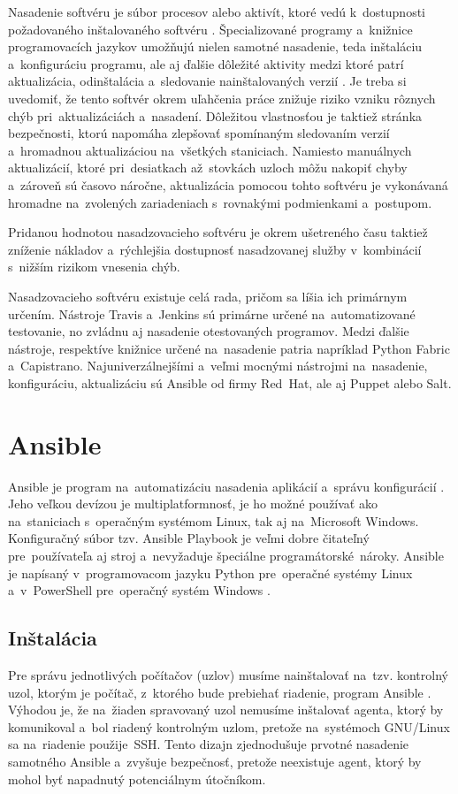 Nasadenie softvéru je súbor procesov alebo aktivít, ktoré vedú k~dostupnosti požadovaného inštalovaného softvéru \cite{deployment-web}. Špecializované programy a~knižnice programovacích jazykov umožňujú nielen samotné nasadenie, teda inštaláciu a~konfiguráciu programu, ale aj ďalšie dôležité aktivity medzi ktoré patrí aktualizácia, odinštalácia a~sledovanie nainštalovaných verzií \cite{deployment-web}. Je treba si uvedomiť, že tento softvér okrem uľahčenia práce znižuje riziko vzniku rôznych chýb pri~aktualizáciách a~nasadení. Dôležitou vlastnosťou je taktiež stránka bezpečnosti, ktorú napomáha zlepšovať spomínaným sledovaním verzií a~hromadnou aktualizáciou na~všetkých staniciach. Namiesto manuálnych aktualizácií, ktoré pri~desiatkach až~stovkách uzloch môžu nakopiť chyby a~zároveň sú časovo náročne, aktualizácia pomocou tohto softvéru je vykonávaná hromadne na~zvolených zariadeniach s~rovnakými podmienkami a~postupom.

Pridanou hodnotou nasadzovacieho softvéru je okrem ušetreného času taktiež zníženie nákladov a~rýchlejšia dostupnosť nasadzovanej služby v~kombinácií s~nižším rizikom vnesenia chýb.

Nasadzovacieho softvéru existuje celá rada, pričom sa líšia ich primárnym určením. Nástroje Travis a~Jenkins sú primárne určené na~automatizované testovanie, no zvládnu aj nasadenie otestovaných programov. Medzi ďalšie nástroje, respektíve knižnice určené na~nasadenie patria napríklad \mbox{Python} Fabric a~Capistrano. Najuniverzálnejšími a~veľmi mocnými nástrojmi na~nasadenie, konfiguráciu, aktualizáciu sú Ansible od firmy \mbox{Red Hat}, ale aj Puppet alebo Salt.

\section{Ansible}
Ansible je program na~automatizáciu nasadenia aplikácií a~správu konfigurácií \cite{ansible}. Jeho veľkou devízou je multiplatformnosť, je ho možné používať ako na~staniciach s~operačným systémom Linux, tak aj na~Microsoft Windows. Konfiguračný súbor tzv. Ansible \mbox{Playbook} je veľmi dobre čitateľný pre~používateľa aj stroj a~nevyžaduje špeciálne \mbox{programátorské nároky}. Ansible je napísaný v~programovacom jazyku \mbox{Python} pre~operačné systémy Linux a~v~PowerShell pre~operačný systém Windows \cite{ansible}.
\subsection*{Inštalácia}
Pre správu jednotlivých počítačov (uzlov) musíme nainštalovať na~tzv. kontrolný uzol, ktorým je počítač, z~ktorého bude prebiehať riadenie, program Ansible \cite{ansible}. Výhodou je, že na~žiaden spravovaný uzol nemusíme inštalovať agenta, ktorý by komunikoval a~bol riadený kontrolným uzlom, pretože na~systémoch GNU/Linux sa na~riadenie \mbox{použije SSH}. Tento dizajn zjednodušuje prvotné nasadenie samotného Ansible a~zvyšuje bezpečnosť, pretože neexistuje agent, ktorý by mohol byť napadnutý potenciálnym útočníkom.


